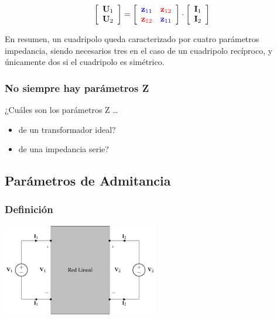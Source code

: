 \[
  \left[
    \begin{array}{c}
      \mathbf{U}_1\\
      \mathbf{U}_2
    \end{array}
  \right] =
  \left[
    \begin{array}{cc}
      \color{blue}{\mathbf{z}_{11}} & \color{red}{\mathbf{z}_{12}}\\
      \color{red}{\mathbf{z}_{12}} & \color{blue}{\mathbf{z}_{11}}
    \end{array}
  \right] \cdot
  \left[
    \begin{array}{c}
      \mathbf{I}_1\\
      \mathbf{I}_2
    \end{array}
  \right]
\]

En resumen, un cuadripolo queda caracterizado por cuatro parámetros impedancia, siendo necesarios tres en el caso de un cuadripolo recíproco, y únicamente dos si el cuadripolo es simétrico.

\subsubsection{No siempre hay parámetros Z}
\label{sec:orga3d8e88}

¿Cuáles son los parámetros Z \ldots{} 

\begin{itemize}
\item de un transformador ideal?
\item de una impedancia serie?
\end{itemize}

\subsection{Parámetros de Admitancia}
\label{sec:orgf2edf7b}
\subsubsection{Definición}
\label{sec:org4be9299}

\includegraphics[height=4cm]{../figs/cuadripolo_fuentes_tension.pdf}


